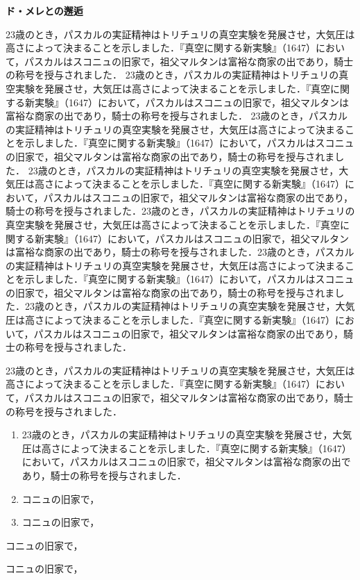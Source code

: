 \begin{コラム}
\noindent
\textbf{ド・メレとの邂逅}\par
23歳のとき，パスカルの実証精神はトリチュリの真空実験を発展させ，大気圧は高さによって決まることを示しました．『真空に関する新実験』（1647）において，パスカルはスコニュの旧家で，祖父マルタンは富裕な商家の出であり，騎士の称号を授与されました．
23歳のとき，パスカルの実証精神はトリチュリの真空実験を発展させ，大気圧は高さによって決まることを示しました．『真空に関する新実験』（1647）において，パスカルはスコニュの旧家で，祖父マルタンは富裕な商家の出であり，騎士の称号を授与されました．
23歳のとき，パスカルの実証精神はトリチュリの真空実験を発展させ，大気圧は高さによって決まることを示しました．『真空に関する新実験』（1647）において，パスカルはスコニュの旧家で，祖父マルタンは富裕な商家の出であり，騎士の称号を授与されました．
23歳のとき，パスカルの実証精神はトリチュリの真空実験を発展させ，大気圧は高さによって決まることを示しました．『真空に関する新実験』（1647）において，パスカルはスコニュの旧家で，祖父マルタンは富裕な商家の出であり，騎士の称号を授与されました．23歳のとき，パスカルの実証精神はトリチュリの真空実験を発展させ，大気圧は高さによって決まることを示しました．『真空に関する新実験』（1647）において，パスカルはスコニュの旧家で，祖父マルタンは富裕な商家の出であり，騎士の称号を授与されました．23歳のとき，パスカルの実証精神はトリチュリの真空実験を発展させ，大気圧は高さによって決まることを示しました．『真空に関する新実験』（1647）において，パスカルはスコニュの旧家で，祖父マルタンは富裕な商家の出であり，騎士の称号を授与されました．23歳のとき，パスカルの実証精神はトリチュリの真空実験を発展させ，大気圧は高さによって決まることを示しました．『真空に関する新実験』（1647）において，パスカルはスコニュの旧家で，祖父マルタンは富裕な商家の出であり，騎士の称号を授与されました．
\end{コラム}

\begin{章末問題}
\item[問題1] 23歳のとき，パスカルの実証精神はトリチュリの真空実験を発展させ，大気圧は高さによって決まることを示しました．『真空に関する新実験』（1647）において，パスカルはスコニュの旧家で，祖父マルタンは富裕な商家の出であり，騎士の称号を授与されました．
\begin{enumerate}
\item 23歳のとき，パスカルの実証精神はトリチュリの真空実験を発展させ，大気圧は高さによって決まることを示しました．『真空に関する新実験』（1647）において，パスカルはスコニュの旧家で，祖父マルタンは富裕な商家の出であり，騎士の称号を授与されました．
\item コニュの旧家で，
\item コニュの旧家で，
\end{enumerate}
\item[問題2] コニュの旧家で，
\item[問題3] コニュの旧家で，
\end{章末問題}

